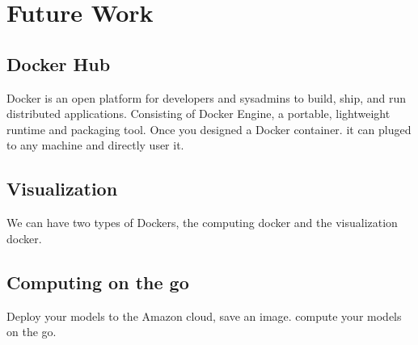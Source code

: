 \chapter{Future Work}

\section{Docker Hub}
Docker is an open platform for developers and sysadmins to build, ship, and run distributed applications. Consisting of Docker Engine, a portable, lightweight runtime and packaging tool.
Once you designed a Docker container. it can pluged to any machine and directly user it.
\section{Visualization}
We can have two types of Dockers, the computing docker and the visualization docker.
\section{Computing on the go}
Deploy your models to the Amazon cloud, save an image. compute your models on the go.
